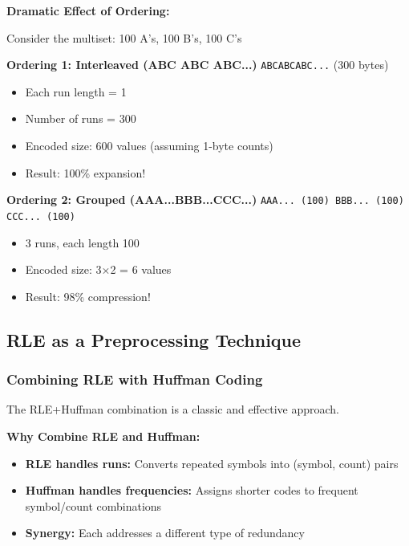 \begin{examplebox}
\textbf{Dramatic Effect of Ordering:}

Consider the multiset: 100 A's, 100 B's, 100 C's

\textbf{Ordering 1: Interleaved (ABC ABC ABC...)} 
\texttt{ABCABCABC...} (300 bytes)
\begin{itemize}
    \item Each run length = 1
    \item Number of runs = 300
    \item Encoded size: 600 values (assuming 1-byte counts)
    \item Result: 100\% expansion!
\end{itemize}

\textbf{Ordering 2: Grouped (AAA...BBB...CCC...)}
\texttt{AAA... (100) BBB... (100) CCC... (100)}
\begin{itemize}
    \item 3 runs, each length 100
    \item Encoded size: 3×2 = 6 values
    \item Result: 98\% compression!
\end{itemize}
\end{examplebox}

\subsection{RLE as a Preprocessing Technique}

\subsubsection{Combining RLE with Huffman Coding}

The RLE+Huffman combination is a classic and effective approach.

\begin{importantbox}
\textbf{Why Combine RLE and Huffman:}

\begin{itemize}
    \item \textbf{RLE handles runs:} Converts repeated symbols into (symbol, count) pairs
    \item \textbf{Huffman handles frequencies:} Assigns shorter codes to frequent symbol/count combinations
    \item \textbf{Synergy:} Each addresses a different type of redundancy
\end{itemize}
\end{importantbox}

